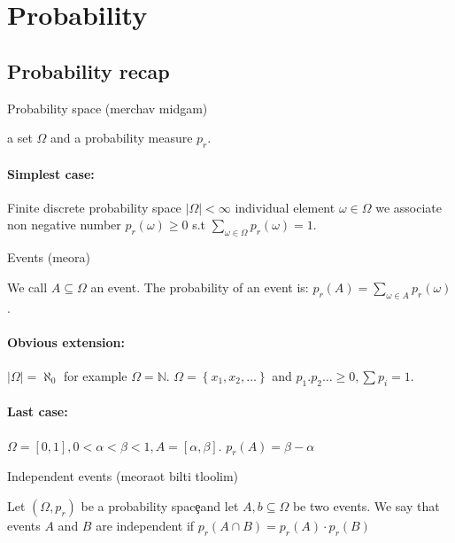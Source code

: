 \chapter{Probability}

\section{Probability recap}
\begin{definition}
Probability space (merchav midgam)

a set $\Omega$ and a probability measure $p_{r}$. 
\end{definition}


\subsubsection*{Simplest case:}

Finite discrete probability space $\left|\Omega\right|<\infty$ individual
element $\omega\in\Omega$ we associate non negative number $p_{r}\left(\omega\right)\ge0$
s.t $\sum\limits _{\omega\in\Omega}p_{r}\left(\omega\right)=1$.
\begin{definition}
Events (meora)

We call $A\subseteq\Omega$ an event. The probability of an event
is: $p_{r}\left(A\right)=\sum\limits _{\omega\in A}p_{r}\left(\omega\right)$. 
\end{definition}


\subsubsection*{Obvious extension: }

$\left|\Omega\right|=\aleph_{0}$ for example $\Omega=\mathbb{N}$.
$\Omega=\left\{ x_{1},x_{2},\dots\right\} $ and $p_{1}.p_{2}\dots\ge0,\sum p_{i}=1$.

\subsubsection*{Last case:}

$\Omega=\left[0,1\right],0<\alpha<\beta<1,A=\left[\alpha,\beta\right]$.
$p_{r}\left(A\right)=\beta-\alpha$
\begin{definition}
Independent events (meoraot bilti tloolim)

Let $\left(\Omega,p_{r}\right)$ be a probability space\c{ }and let
$A,b\subseteq\Omega$ be two events. We say that events $A$ and $B$
are independent if $p_{r}\left(A\cap B\right)=p_{r}\left(A\right)\cdot p_{r}\left(B\right)$
\end{definition}

